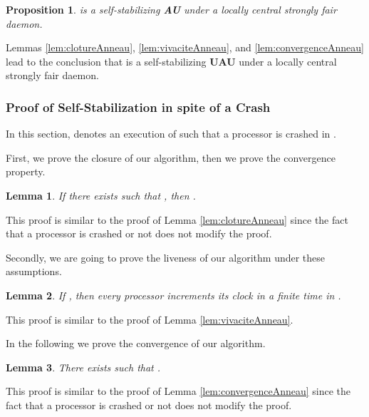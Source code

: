 \documentclass[11pt,english,letterpaper]{article}
\newtheorem{lemma}{Lemma}
\newtheorem{proposition}{Proposition}
\newenvironment{proof}{{\noindent\bf Proof. } }{{\hfill }}
\begin{document}
\begin{proposition}\label{prop:SSAnneau}
 is a self-stabilizing \textbf{AU} under a locally central strongly fair daemon.
\end{proposition}

\begin{proof}
Lemmas \ref{lem:clotureAnneau}, \ref{lem:vivaciteAnneau}, and \ref{lem:convergenceAnneau} lead to the conclusion that  is a self-stabilizing \textbf{UAU} under a locally central strongly fair daemon.
\end{proof}
		
\subsubsection{Proof of Self-Stabilization in spite of a Crash}
	
In this section,  denotes an execution of  such that a processor  is crashed in .

First, we prove the closure of our algorithm, then we prove the convergence property.

\begin{lemma}\label{lem:clotureCrashAnneau}
If there exists  such that , then .
\end{lemma}

\begin{proof}
This proof is similar to the proof of Lemma \ref{lem:clotureAnneau} since the fact that a processor is crashed or not does not modify the proof.
\end{proof}

Secondly, we are going to prove the liveness of our algorithm under these assumptions.

\begin{lemma}\label{lem:vivaciteCrashAnneau}
If , then every processor  increments its clock in a finite time in .
\end{lemma}

\begin{proof}
This proof is similar to the proof of Lemma \ref{lem:vivaciteAnneau}.
\end{proof}
		
In the following we prove the convergence of our algorithm.

\begin{lemma}\label{lem:convergenceCrashAnneau}
There exists  such that .
\end{lemma}

\begin{proof}
This proof is similar to the proof of Lemma \ref{lem:convergenceAnneau} since the fact that a processor is crashed or not does not modify the proof.
\end{proof}
\end{document}
